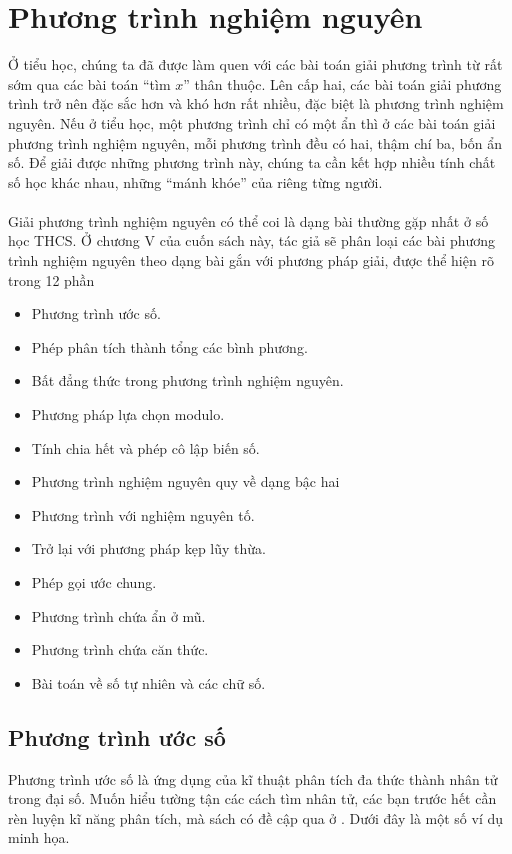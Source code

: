\chapter{Phương trình nghiệm nguyên}

Ở tiểu học, chúng ta đã được làm quen với các bài toán giải phương trình từ rất sớm qua các bài toán “tìm $x$” thân thuộc. Lên cấp hai, các bài toán giải phương trình trở nên đặc sắc hơn và khó hơn rất nhiều, đặc biệt là phương trình nghiệm nguyên. Nếu ở tiểu học, một phương trình chỉ có một ẩn thì ở các bài toán giải phương trình nghiệm nguyên, mỗi phương trình đều có hai, thậm chí ba, bốn ẩn số. Để giải được những phương trình này, chúng ta cần kết hợp nhiều tính chất số học khác nhau, những “mánh khóe” của riêng từng người. \\ \\
Giải phương trình nghiệm nguyên có thể coi là dạng bài thường gặp nhất ở số học THCS. Ở chương V của cuốn sách này, tác giả sẽ phân loại các bài phương trình nghiệm nguyên theo dạng bài gắn với phương pháp giải, được thể hiện rõ trong 12 phần
\begin{itemize}
    \item{} Phương trình ước số.
    \item{} Phép phân tích thành tổng các bình phương.
    \item{} Bất đẳng thức trong phương trình nghiệm nguyên.
    \item{} Phương pháp lựa chọn modulo.
    \item{} Tính chia hết và phép cô lập biến số.
    \item{} Phương trình nghiệm nguyên quy về dạng bậc hai
    \item{} Phương trình với nghiệm nguyên tố.
    \item{} Trở lại với phương pháp kẹp lũy thừa.
    \item{} Phép gọi ước chung.
    \item{} Phương trình chứa ẩn ở mũ.
    \item{} Phương trình chứa căn thức.
    \item{} Bài toán về số tự nhiên và các chữ số.
\end{itemize}

\section{Phương trình ước số}
Phương trình ước số là ứng dụng của kĩ thuật phân tích đa thức thành nhân tử trong đại số. Muốn hiểu tường tận các cách tìm nhân tử, các bạn trước hết cần rèn luyện kĩ năng phân tích, mà sách có đề cập qua ở . Dưới đây là một số ví dụ minh họa.

